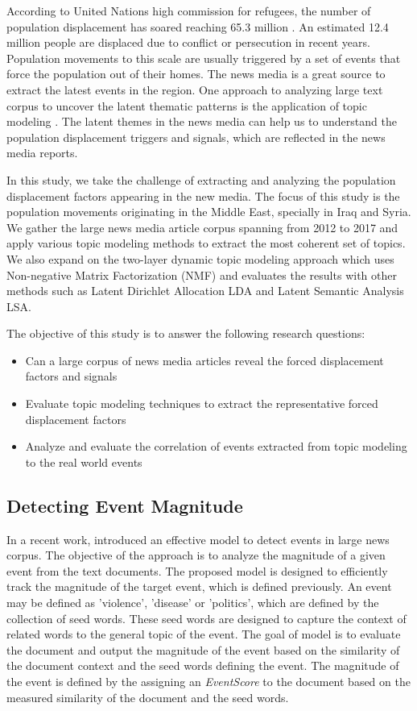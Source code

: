 According to United Nations high commission for refugees, the number of population displacement has soared reaching 65.3 million \cite{unrefugeeagency2016}. An estimated  12.4 million people are displaced due to conflict or persecution in recent years. Population movements to this scale are usually triggered by a set of events that force the population out of their homes. The news media is a great source to extract the latest events in the region. One approach to analyzing large text corpus to uncover the latent thematic patterns is the application of topic modeling \cite{Blei2003}. The latent themes in the news media can help us to understand the population displacement triggers and signals, which are reflected in the news media reports. 

In this study, we take the challenge of extracting and analyzing the population displacement factors appearing in the new media. The focus of this study is the population movements originating in the Middle East, specially in Iraq and Syria. We gather the large news media article corpus spanning from 2012 to 2017 and apply various topic modeling methods to extract the most coherent set of topics. We also expand on the two-layer dynamic topic modeling approach which uses Non-negative Matrix Factorization (NMF) \cite{Lee1999} and evaluates the results with other methods such as Latent Dirichlet Allocation LDA and Latent Semantic Analysis LSA. 

The objective of this study is to answer the following research questions:


\begin{itemize}
\item Can a large corpus of news media articles reveal the forced displacement factors and signals
\item Evaluate topic modeling techniques to extract the representative forced displacement factors
\item Analyze and evaluate the correlation of events extracted from topic modeling to the real world events
\end{itemize}


\subsection{Detecting Event Magnitude}
In a recent work, \cite{Agrawal2016DetectingTM} introduced an effective model to detect events in large  news corpus. The objective of the approach is to analyze the magnitude of a given event from the text documents. The proposed model is designed to efficiently track the magnitude of the target event, which is defined previously. An event may be defined as 'violence', 'disease' or 'politics', which are defined by the collection of seed words. These seed words are designed to capture the context of related words to the general topic of the event. The goal of model is to evaluate the document and output the magnitude of the event based on the similarity of the document context and the seed words defining the event. The magnitude of the event is defined by the assigning an \textit{EventScore} to the document based on the measured similarity of the document and the seed words.  

